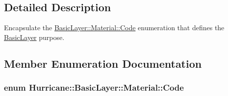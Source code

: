 \subsection{Detailed Description}
Encapsulate the \hyperlink{classHurricane_1_1BasicLayer_1_1Material_a3e815440ad4b86b3569fa54ca06fc3e8}{Basic\-Layer\-::\-Material\-::\-Code} enumeration that defines the \hyperlink{classHurricane_1_1BasicLayer}{Basic\-Layer} purpose. 

\subsection{Member Enumeration Documentation}
\hypertarget{classHurricane_1_1BasicLayer_1_1Material_a3e815440ad4b86b3569fa54ca06fc3e8}{
\subsubsection[{Code}]{\setlength{\rightskip}{0pt plus 5cm}enum {\bf Hurricane\-::\-Basic\-Layer\-::\-Material\-::\-Code}}}\label{classHurricane_1_1BasicLayer_1_1Material_a3e815440ad4b86b3569fa54ca06fc3e8}
